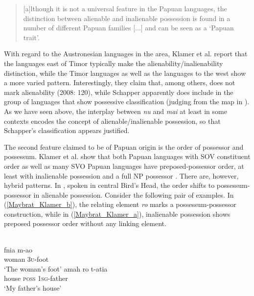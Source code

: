 \begin{quote}[a]lthough it is not a universal feature in the Papuan languages,
the distinction between alienable and inalienable possession is found in a number of different Papuan families [...] and can be seen as a `Papuan trait’.\end{quote}

With regard to the Austronesian languages in the area, Klamer et al. report that the languages east of Timor typically make the alienability/inalienability distinction, while the Timor languages as well as the languages to the west show a more varied pattern. Interestingly, they claim that, among others,  does not mark alienability (2008: 120), while Schapper apparently does include  in the group of languages that show possessive classification (judging from the map in \citealt[110]{schapper2009bunaq}). As we have seen above, the interplay between \textit{nu} and \textit{mai} at least in some contexts encodes the concept of alienable/inalienable possession, so that Schapper's classification appears justified.

The second feature claimed to be of Papuan origin is the order of possessor and possessum. Klamer et al. show that both Papuan languages with SOV constituent order as well as many SVO Papuan languages have preposed-possessor order, at least with inalienable possession and a full NP possessor \citep[123f.]{klamer2008east}. There are, however, hybrid patterns. In , spoken in central Bird's Head, the order shifts to possessum-possessor in alienable possession. Consider the following pair of examples. In (\ref{Maybrat_Klamer_b}), the relating element \textit{ro} marks a possessum-possessor construction, while in (\ref{Maybrat_Klamer_a}), inalienable possession shows preposed possessor order without any linking element.

\ea
{}\\
\ea \label{Maybrat_Klamer_a}
\gll fnia m-ao\\
woman \textsc{3}\textsc{u}-foot\\
\glt ‘The woman's foot’
\ex \label{Maybrat_Klamer_b}
\gll amah ro t-atia\\
house \textsc{poss} \textsc{1}\textsc{sg}-father\\
\glt ‘My father's house’
\z
\z

